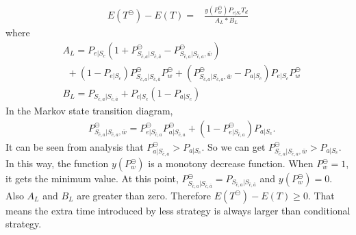 \begin{equation}
\label{equ:detail1}
\begin{split}
E(T^{\ominus}) - E(T) = &\frac{y(P_{w}^{\ominus})P_{e|S_{c}}T_{d}}{A_{L}*B_{L}}
\end{split}\end{equation}
where
\begin{equation*}
\begin{split}
&A_{L}=P_{e|S_{c}}(1+P_{S_{\bar{c}, a}|S_{\bar{c},\bar{a}}}^{\ominus}-P_{S_{\bar{c}, a}|S_{\bar{c},a},\bar{w}}^{\ominus})\\
&\ \ +(1-P_{e|S_{c}})P_{S_{\bar{c}, a}|S_{\bar{c},\bar{a}}}^{\ominus}P_{w}^{\ominus}+(P_{S_{\bar{c}, a}|S_{\bar{c},a},\bar{w}}^{\ominus}-P_{a|S_{c}})P_{e|S_{c}}P_{w}^{\ominus} \\
&B_{L}=P_{S_{\bar{c}, a}|S_{\bar{c},\bar{a}}}+P_{e|S_{c}}(1-P_{a|S_{c}})
\end{split}\end{equation*}
In the Markov state transition diagram,
\begin{equation*}
\begin{split}
&P_{S_{\bar{c}, a}|S_{\bar{c},a},\bar{w}}^{\ominus}=P_{e|S_{\bar{c}, a}}^{\ominus}P_{a|S_{\bar{c}, a}}^{\ominus}+(1-P_{e|S_{\bar{c}, a}}^{\ominus})P_{a|S_{c}} .
\end{split}\end{equation*}
It can be seen from analysis that $P_{a|S_{\bar{c}, a}}^{\ominus} > P_{a|S_{c}}$.
So we can get $P_{S_{\bar{c}, a}|S_{\bar{c},a},\bar{w}}^{\ominus} > P_{a|S_{c}}$.
In this way,
the function $y(P_{w}^{\ominus})$ is a monotony decrease function. When $P_{w}^{\ominus} = 1$, it gets the minimum value.
At this point, $P_{S_{\bar{c}, a}|S_{\bar{c},\bar{a}}}^{\ominus} = P_{S_{\bar{c}, a}|S_{\bar{c},\bar{a}}}$ and $y(P_{w}^{\ominus}) = 0$.
Also $A_{L}$ and $B_{L}$ are greater than zero.
Therefore $E(T^{\ominus}) - E(T)\geq 0$.
That means the extra time introduced by less {\vwarm} strategy is always larger than conditional {\vwarm} strategy.

